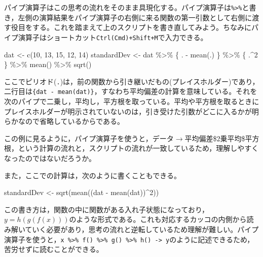 \documentclass[
  a4paper,
]{ltjsbook}
\newenvironment{Shaded}{\begin{snugshade}}{\end{snugshade}}
\newcommand{\DecValTok}[1]{\textcolor[rgb]{0.68,0.00,0.00}{#1}}
\newcommand{\FunctionTok}[1]{\textcolor[rgb]{0.28,0.35,0.67}{#1}}
\newcommand{\NormalTok}[1]{\textcolor[rgb]{0.00,0.23,0.31}{#1}}
\newcommand{\OtherTok}[1]{\textcolor[rgb]{0.00,0.23,0.31}{#1}}
\newcommand{\SpecialCharTok}[1]{\textcolor[rgb]{0.37,0.37,0.37}{#1}}
\begin{document}
パイプ演算子はこの思考の流れをそのまま具現化する。パイプ演算子は\texttt{\%\textgreater{}\%}と書き，左側の演算結果をパイプ演算子の右側に来る関数の第一引数として右側に渡す役目をする。これを踏まえて上のスクリプトを書き直してみよう。ちなみにパイプ演算子はショートカット\texttt{Ctrl(Cmd)+Shift+M}で入力できる。

\begin{Shaded}
\begin{Highlighting}[]
\NormalTok{dat }\OtherTok{\textless{}{-}} \FunctionTok{c}\NormalTok{(}\DecValTok{10}\NormalTok{, }\DecValTok{13}\NormalTok{, }\DecValTok{15}\NormalTok{, }\DecValTok{12}\NormalTok{, }\DecValTok{14}\NormalTok{)}
\NormalTok{standardDev }\OtherTok{\textless{}{-}}\NormalTok{ dat }\SpecialCharTok{\%\textgreater{}\%}
\NormalTok{  \{}
\NormalTok{    . }\SpecialCharTok{{-}} \FunctionTok{mean}\NormalTok{(.)}
\NormalTok{  \} }\SpecialCharTok{\%\textgreater{}\%}
\NormalTok{  \{}
\NormalTok{    .}\SpecialCharTok{\^{}}\DecValTok{2}
\NormalTok{  \} }\SpecialCharTok{\%\textgreater{}\%}
  \FunctionTok{mean}\NormalTok{() }\SpecialCharTok{\%\textgreater{}\%}
  \FunctionTok{sqrt}\NormalTok{()}
\end{Highlighting}
\end{Shaded}

ここでピリオド(\texttt{.})は，前の関数から引き継いだもの(プレイスホルダー)であり，二行目は\texttt{\{dat\ -\ mean(dat)\}}，すなわち平均偏差の計算を意味している。それを次のパイプで二乗し，平均し，平方根を取っている。平均や平方根を取るときにプレイスホルダーが明示されていないのは，引き受けた引数がどこに入るかが明らかなので省略しているからである。

この例に見るように，パイプ演算子を使うと，データ\(\to\)平均偏差\$\to\(2乗\)\to\(平均\)\to\$平方根，という計算の流れと，スクリプトの流れが一致しているため，理解しやすくなったのではないだろうか。

また，ここでの計算は，次のように書くこともできる。

\begin{Shaded}
\begin{Highlighting}[]
\NormalTok{standardDev }\OtherTok{\textless{}{-}} \FunctionTok{sqrt}\NormalTok{(}\FunctionTok{mean}\NormalTok{((dat }\SpecialCharTok{{-}} \FunctionTok{mean}\NormalTok{(dat))}\SpecialCharTok{\^{}}\DecValTok{2}\NormalTok{))}
\end{Highlighting}
\end{Shaded}

この書き方は，関数の中に関数がある入れ子状態になっており，\(y = h(g(f(x)))\)のような形式である。これも対応するカッコの内側から読み解いていく必要があり，思考の流れと逆転しているため理解が難しい。パイプ演算子を使うと，\texttt{x\ \%\textgreater{}\%\ f()\ \%\textgreater{}\%\ g()\ \%\textgreater{}\%\ h()\ -\textgreater{}\ y}のように記述できるため，苦労せずに読むことができる。
\end{document}
